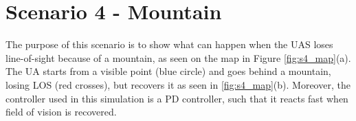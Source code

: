 \newpage
\section{Scenario 4 - Mountain}\label{sec:scenario4}
The purpose of this scenario is to show what can happen when the UAS loses line-of-sight because of a mountain, as seen on the map in Figure \ref{fig:s4_map}(a). The UA starts from a visible point (blue circle) and goes behind a mountain, losing LOS (red crosses), but recovers it as seen in \ref{fig:s4_map}(b). Moreover, the controller used in this simulation is a PD controller, such that it reacts fast when field of vision is recovered.

\begin{figure}[H]
	\centering

\end{figure}

